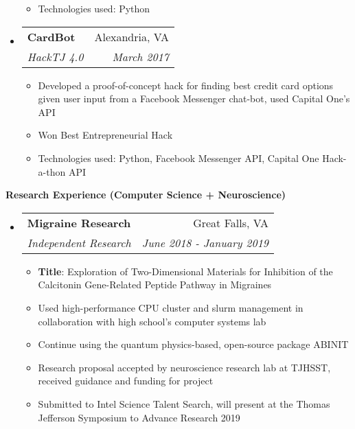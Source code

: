 \documentclass[letterpaper,11pt]{article}
\makeatletter
\newcommand{\resitem}[1]{\item #1 \vspace{-2pt}}
\newcommand{\resheading}[1]{{\large \colorbox{mygrey}{\begin{minipage}{\textwidth}{\textbf{#1 \vphantom{p\^{E}}}}\end{minipage}}}}
\newcommand{\ressubheading}[4]{
\begin{tabular*}{7.0in}{l@{\extracolsep{\fill}}r}
		\textbf{#1} & #2 \\
		\textit{#3} & \textit{#4} \\
\end{tabular*}\vspace{-6pt}}
\makeatother
\begin{document}
\begin{itemize}
\begin{itemize}
        \resitem{Technologies used: Python}
    \end{itemize}
\item
    \ressubheading{CardBot}{Alexandria, VA}{HackTJ 4.0}{March 2017}
    \begin{itemize}
        \resitem{Developed a proof-of-concept hack for finding best credit card options given user input from a Facebook Messenger chat-bot, used Capital One's API}
        \resitem{Won Best Entrepreneurial Hack}
        \resitem{Technologies used: Python, Facebook Messenger API, Capital One Hack-a-thon API}
    \end{itemize}
\end{itemize}

\pagebreak

\resheading{Research Experience (Computer Science + Neuroscience)}
\begin{itemize}
\item
	\ressubheading{Migraine Research}{Great Falls, VA}{Independent Research}{June 2018 - January 2019}
	\begin{itemize}
		\resitem{\textbf{Title}: Exploration of Two-Dimensional Materials for Inhibition of the 
	Calcitonin Gene-Related Peptide Pathway in Migraines}
	    \resitem{Used high-performance CPU cluster and slurm management in collaboration with high school's computer systems lab}
	    \resitem{Continue using the quantum physics-based, open-source package ABINIT}
	    \resitem{Research proposal accepted by neuroscience research lab at TJHSST, received guidance and funding for project}
	    \resitem{Submitted to Intel Science Talent Search, will present at the Thomas Jefferson Symposium to Advance Research 2019}

\end{itemize}
\end{itemize}
\end{document}
